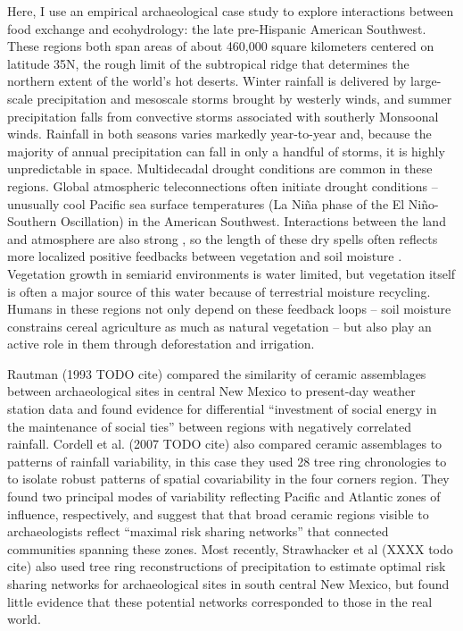 \documentclass[fleqn,10pt]{wlscirep}
\begin{document}
Here, I use an empirical archaeological case study to explore interactions between food exchange and ecohydrology: the late pre-Hispanic American Southwest. These regions both span areas of about 460,000 square kilometers centered on latitude 35\degree N, the rough limit of the subtropical ridge that determines the northern extent of the world's hot deserts. Winter rainfall is delivered by large-scale precipitation and mesoscale storms brought by westerly winds, and summer precipitation falls from convective storms associated with southerly Monsoonal winds. Rainfall in both seasons varies markedly year-to-year and, because the majority of annual precipitation can fall in only a handful of storms, it is highly unpredictable in space. Multidecadal drought conditions are common in these regions. Global atmospheric teleconnections often initiate drought conditions -- unusually cool Pacific sea surface temperatures (La Ni\~{n}a phase of the El Ni\~{n}o-Southern Oscillation) in the American Southwest. Interactions between the land and atmosphere are also strong \cite{Koster2004RegionsPrecipitation}, so the length of these dry spells often reflects more localized positive feedbacks between vegetation and soil moisture \cite{Ault2014AssessingData}. Vegetation growth in semiarid environments is water limited, but vegetation itself is often a major source of this  water because of terrestrial moisture recycling. Humans in these regions not only depend on these feedback loops -- soil moisture constrains cereal agriculture as much as natural vegetation -- but also play an active role in them through deforestation and irrigation.

Rautman (1993 TODO cite) compared the similarity of ceramic assemblages between archaeological sites in central New Mexico to present-day weather station data and found evidence for differential ``investment of social energy in the maintenance of social ties'' between regions with negatively correlated rainfall. Cordell et al. (2007 TODO cite) also compared ceramic assemblages to patterns of rainfall variability, in this case they used 28 tree ring chronologies to to isolate robust patterns of spatial covariability in the four corners region. They found two principal modes of variability reflecting Pacific and Atlantic zones of influence, respectively, and suggest that that broad ceramic regions visible to archaeologists reflect ``maximal risk sharing networks'' that connected communities spanning these zones. Most recently, Strawhacker et al (XXXX todo cite) also used tree ring reconstructions of precipitation to estimate optimal risk sharing networks for archaeological sites in south central New Mexico, but found little evidence that these potential networks corresponded to those in the real world.
\end{document}
